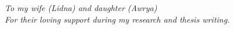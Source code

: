 \documentclass[\main/thesis.tex]{subfiles}
\begin{document}
\begin{dedication}
	\vspace*{1in}
	\begin{center}
	         \emph{To my wife (Lidna) and daughter (Awrya)} \\
             \emph{For their loving support during my research and thesis writing.}
	\end{center}
\end{dedication}
\end{document}
